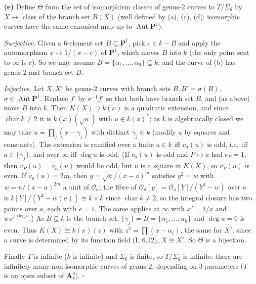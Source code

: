 \documentclass[11pt]{article}
\begin{document}
\textbf{(e)} Define $\Theta$ from the set of isomorphism classes of genus-$2$ curves to $T/\Sigma_6$ by $X\mapsto$ class of the branch set $B(X)$ (well defined by (a), (c), (d); isomorphic curves have the same canonical map up to $\operatorname{Aut}\mathbf P^1$).

\emph{Surjective.} Given a $6$-element set $B\subseteq\mathbf P^1$, pick $c\in k-B$ and apply the automorphism $x\mapsto1/(x-c)$ of $\mathbf P^1$, which moves $B$ into $k$ (the only point sent to $\infty$ is $c$). So we may assume $B=\{\alpha_1,\dots,\alpha_6\}\subseteq k$, and the curve of (b) has genus $2$ and branch set $B$.

\emph{Injective.} Let $X,X'$ be genus-$2$ curves with branch sets $B,B'=\sigma(B)$, $\sigma\in\operatorname{Aut}\mathbf P^1$. Replace $f'$ by $\sigma^{-1}f'$ so that both have branch set $B$, and (as above) move $B$ into $k$. Then $K(X)\supseteq k(x)$ is a quadratic extension, and since $\operatorname{char}k\ne2$ it is $k(x)(\sqrt u)$ with $u\in k(x)^*$; as $k$ is algebraically closed we may take $u=\prod_j(x-\gamma_j)$ with distinct $\gamma_j\in k$ (modify $u$ by squares and constants). The extension is ramified over a finite $a\in k$ iff $v_a(u)$ is odd, i.e.\ iff $a\in\{\gamma_j\}$, and over $\infty$ iff $\deg u$ is odd. (If $v_a(u)$ is odd and $P\mapsto a$ had $e_P=1$, then $v_P(u)=v_a(u)$ would be odd, but $u$ is a square in $K(X)$, so $v_P(u)$ is even. If $v_a(u)=2m$, then $y=\sqrt u/(x-a)^m$ satisfies $y^2=w$ with $w=u/(x-a)^{2m}$ a unit of $\mathcal O_a$; the fibre of $\mathcal O_a[y]=\mathcal O_a[Y]/(Y^2-w)$ over $a$ is $k[Y]/(Y^2-w(a))\cong k\times k$ since $\operatorname{char}k\ne2$, so the integral closure has two points over $a$, each with $e=1$. The same applies at $\infty$ with $x'=1/x$ and $u\,x'^{\,\deg u}$.) As $B\subseteq k$ is the branch set, $\{\gamma_j\}=B=\{\alpha_1,\dots,\alpha_6\}$ and $\deg u=6$ is even. Thus $K(X)\cong k(x)(z)$ with $z^2=\prod(x-\alpha_i)$, the same for $X'$; since a curve is determined by its function field (I, 6.12), $X\cong X'$. So $\Theta$ is a bijection.

Finally $T$ is infinite ($k$ is infinite) and $\Sigma_6$ is finite, so $T/\Sigma_6$ is infinite: there are infinitely many non-isomorphic curves of genus $2$, depending on $3$ parameters ($T$ is an open subset of $\mathbf A^3_k$). \hfill$\square$
\end{document}
